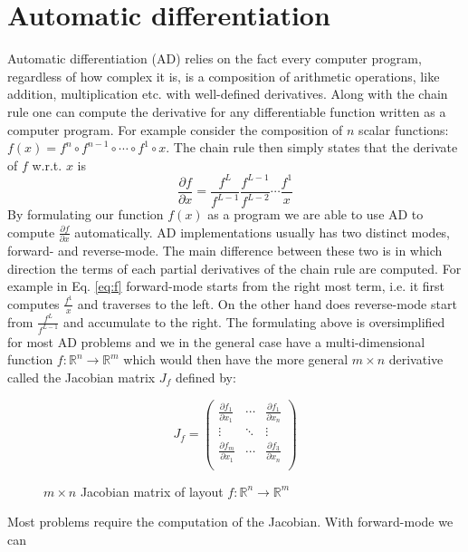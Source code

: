 	\section{Automatic differentiation}
	Automatic differentiation (AD) relies on the fact every computer program,
	regardless of how complex it is, 
	is a composition of arithmetic operations, like addition, multiplication etc.
	with well-defined derivatives. 
	Along with the chain rule one can compute the derivative for any differentiable
	function written as a computer program.  
	For example consider the composition of $n$ scalar functions:
	$f(x) = f^n \circ f^{n-1} \circ \cdots \circ f^1 \circ x$. The chain rule 
	then simply states that the derivate of 
	$f$ w.r.t. $x$ is 
	\begin{equation}
	\frac{\partial f}{\partial x} = \frac{f^L}{f^{L-1}} \frac{f^{L-1}}{f^{L-2}}
	\cdots \frac{f^1}{x}
	\label{eq:f}
	\end{equation}
	By formulating our function $f(x)$ as a program we are able to use AD to compute
	$\frac{\partial f}{\partial x}$ automatically. 
	AD implementations usually has two distinct modes, forward- and reverse-mode.
	The main difference between these two is in which direction the terms of each
	partial derivatives of the chain rule
	are computed. For example in Eq. \ref{eq:f} forward-mode starts from the right
	most term, i.e. it first computes $\frac{f^1}{x}$
	and traverses to the left. On the other hand does reverse-mode start from
	$\frac{f^L}{f^{L-1}}$ and accumulate to the right. \newline 
	The formulating above is oversimplified for most AD problems and we in the
	general case 
	have a multi-dimensional function $f : \mathbb{R}^n \to \mathbb{R}^m$  which
	would then have the more general $m\times n$ derivative called the Jacobian matrix $J_f$ defined by:
	\begin{figure}[H]
		$$ J_{f} = \left(\begin{matrix}
		\frac{\partial f_1}{\partial x_1} & \cdots & \frac{\partial f_1}{\partial x_n}
		\\
		\vdots & \ddots & \vdots \\
		\frac{\partial f_m}{\partial x_1} & \cdots  &  \frac{\partial f_3}{\partial
			x_n}\\
		\end{matrix}\right) $$
		\caption{$m\times n$ Jacobian matrix of layout $f : \mathbb{R}^n \to
			\mathbb{R}^m$}
	\end{figure}
    Most problems require the computation of the Jacobian. With forward-mode we can
